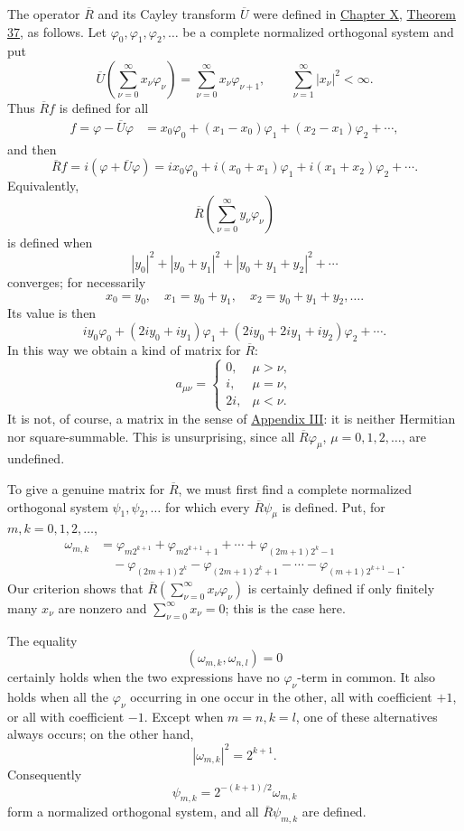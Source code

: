 ﻿\documentclass[paper=b5,fontsize=13pt,bookmarkpackage=false,twoside]{scrartcl}
\begin{document}
The operator \(\overline R\) and its Cayley transform \(\overline U\)
were defined in \hyperref[chap:X]{Chapter X},
\hyperref[thm:37]{Theorem 37}, as follows.  Let
\(\varphi_0,\varphi_1,\varphi_2,\ldots\) be a complete normalized
orthogonal system and put
\[
  \overline U\left(\sum_{\nu=0}^{\infty}x_\nu\varphi_\nu\right)
  =\sum_{\nu=0}^{\infty}x_\nu\varphi_{\nu+1},
  \qquad
  \sum_{\nu=1}^{\infty}|x_\nu|^2<\infty.
\]
Thus \(\overline Rf\) is defined for all
\begin{align*}
 f=\varphi-\overline U\varphi
 &=x_0\varphi_0+(x_1-x_0)\varphi_1
   +(x_2-x_1)\varphi_2+\cdots,
\end{align*}
and then
\[
  \overline Rf=i(\varphi+\overline U\varphi)
  =ix_0\varphi_0+i(x_0+x_1)\varphi_1
   +i(x_1+x_2)\varphi_2+\cdots.
\]
Equivalently,
\[
  \overline R\left(\sum_{\nu=0}^{\infty}y_\nu\varphi_\nu\right)
\]
is defined when
\[
  |y_0|^2+|y_0+y_1|^2+|y_0+y_1+y_2|^2+\cdots
\]
converges; for necessarily
\[
  x_0=y_0,\quad x_1=y_0+y_1,\quad
  x_2=y_0+y_1+y_2,\ldots.
\]
Its value is then
\[
  iy_0\varphi_0+(2iy_0+iy_1)\varphi_1
  +(2iy_0+2iy_1+iy_2)\varphi_2+\cdots.
\]
In this way we obtain a kind of matrix for \(\overline R\):
\[
  a_{\mu\nu}=
  \begin{cases}
    0,&\mu>\nu,\\
    i,&\mu=\nu,\\
    2i,&\mu<\nu.
  \end{cases}
\]
It is not, of course, a matrix in the sense of
\hyperref[app:III]{Appendix III}: it is neither Hermitian nor
square-summable.  This is unsurprising, since all
\(\overline R\varphi_\mu\), \(\mu=0,1,2,\ldots\), are undefined.

To give a genuine matrix for \(\overline R\), we must first find a
complete normalized orthogonal system
\(\psi_1,\psi_2,\ldots\) for which every
\(\overline R\psi_\mu\) is defined.  Put, for \(m,k=0,1,2,\ldots\),
\begin{align*}
 \omega_{m,k}
 &=\varphi_{m2^{k+1}}+\varphi_{m2^{k+1}+1}
   +\cdots+\varphi_{(2m+1)2^k-1}\\
 &\quad-\varphi_{(2m+1)2^k}
   -\varphi_{(2m+1)2^k+1}
   -\cdots-\varphi_{(m+1)2^{k+1}-1}.
\end{align*}
Our criterion shows that
\(\overline R(\sum_{\nu=0}^{\infty}x_\nu\varphi_\nu)\) is certainly
defined if only finitely many \(x_\nu\) are nonzero and
\(\sum_{\nu=0}^{\infty}x_\nu=0\); this is the case here.

The equality
\[
  (\omega_{m,k},\omega_{n,l})=0
\]
certainly holds when the two expressions have no
\(\varphi_\nu\)-term in common.  It also holds when all the
\(\varphi_\nu\) occurring in one occur in the other, all with
coefficient \(+1\), or all with coefficient \(-1\).  Except when
\(m=n,k=l\), one of these alternatives always occurs; on the other
hand,
\[
  |\omega_{m,k}|^2=2^{k+1}.
\]
Consequently
\[
  \psi_{m,k}=2^{-(k+1)/2}\omega_{m,k}
\]
form a normalized orthogonal system, and all
\(\overline R\psi_{m,k}\) are defined.
\end{document}

